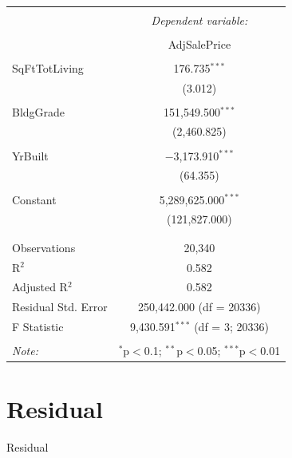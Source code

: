 \documentclass[12pt,letterpaper]{article}
\begin{document}
\begin{table}[!htbp] \centering   \caption{}   \label{} 
	\begin{tabular}{@{\extracolsep{5pt}}lc} \\[-1.8ex]\hline \hline \\[-1.8ex]  & \multicolumn{1}{c}{\textit{Dependent variable:}} \\ \cline{2-2} \\[-1.8ex] & AdjSalePrice \\ \hline \\[-1.8ex]  SqFtTotLiving & 176.735$^{***}$ \\   & (3.012) \\   & \\  BldgGrade & 151,549.500$^{***}$ \\   & (2,460.825) \\   & \\  YrBuilt & $-$3,173.910$^{***}$ \\   & (64.355) \\   & \\  Constant & 5,289,625.000$^{***}$ \\   & (121,827.000) \\   & \\ \hline \\[-1.8ex] Observations & 20,340 \\ R$^{2}$ & 0.582 \\ Adjusted R$^{2}$ & 0.582 \\ Residual Std. Error & 250,442.000 (df = 20336) \\ F Statistic & 9,430.591$^{***}$ (df = 3; 20336) \\ \hline \hline \\[-1.8ex] \textit{Note:}  & \multicolumn{1}{r}{$^{*}$p$<$0.1; $^{**}$p$<$0.05; $^{***}$p$<$0.01} \\ 
\end{tabular} 
\end{table} 


\section{ Residual}


\noindent Residual  \\

 \vspace{.25cm}
 
\end{document}
